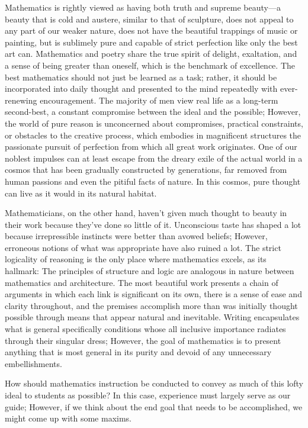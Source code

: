 \documentclass[a4paper,12pt]{book}[2004/02/16]
\theoremstyle{ilemma}
\theoremstyle{itheorem}
\theoremstyle{iother}
\theoremstyle{icorollary}
\theoremstyle{numcorollary}
\theoremstyle{idefinition}
\begin{document}
Mathematics is rightly viewed as having both truth and supreme beauty—a beauty that is cold and austere, similar to that of sculpture, does not appeal to any part of our weaker nature, does not have the beautiful trappings of music or painting, but is sublimely pure and capable of strict perfection like only the best art can. Mathematics and poetry share the true spirit of delight, exaltation, and a sense of being greater than oneself, which is the benchmark of excellence. The best mathematics should not just be learned as a task; rather, it should be incorporated into daily thought and presented to the mind repeatedly with ever-renewing encouragement. The majority of men view real life as a long-term second-best, a constant compromise between the ideal and the possible; However, the world of pure reason is unconcerned about compromises, practical constraints, or obstacles to the creative process, which embodies in magnificent structures the passionate pursuit of perfection from which all great work originates. One of our noblest impulses can at least escape from the dreary exile of the actual world in a cosmos that has been gradually constructed by generations, far removed from human passions and even the pitiful facts of nature. In this cosmos, pure thought can live as it would in its natural habitat.

Mathematicians, on the other hand, haven't given much thought to beauty in their work because they've done so little of it. Unconscious taste has shaped a lot because irrepressible instincts were better than avowed beliefs; However, erroneous notions of what was appropriate have also ruined a lot. The strict logicality of reasoning is the only place where mathematics excels, as its hallmark: The principles of structure and logic are analogous in nature between mathematics and architecture. The most beautiful work presents a chain of arguments in which each link is significant on its own, there is a sense of ease and clarity throughout, and the premises accomplish more than was initially thought possible through means that appear natural and inevitable. Writing encapsulates what is
general specifically conditions whose all inclusive importance
radiates through their singular dress; However, the goal of mathematics is to present anything that is most general in its purity and devoid of any unnecessary embellishments.

How should mathematics instruction be conducted to convey as much of this lofty ideal to students as possible?
In this case, experience must largely serve as our guide; However, if we think about the end goal that needs to be accomplished, we might come up with some maxims.
\end{document}
